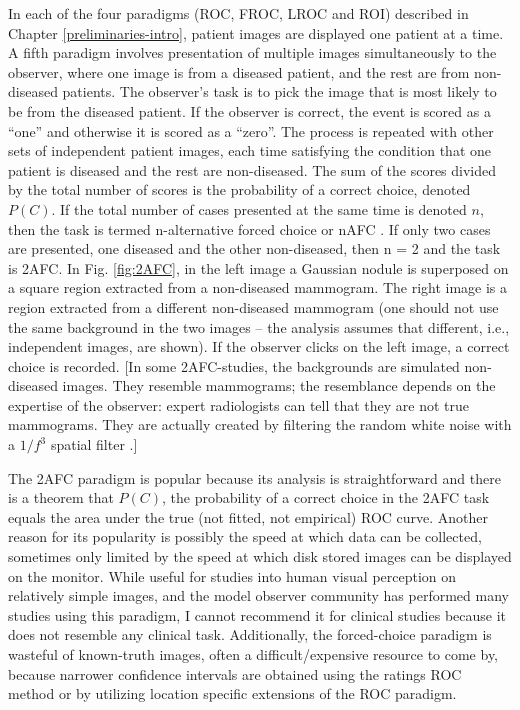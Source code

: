 \documentclass[
]{book}
\begin{document}
In each of the four paradigms (ROC, FROC, LROC and ROI) described in Chapter \ref{preliminaries-intro}, patient images are displayed one patient at a time. A fifth paradigm involves presentation of multiple images simultaneously to the observer, where one image is from a diseased patient, and the rest are from non-diseased patients. The observer's task is to pick the image that is most likely to be from the diseased patient. If the observer is correct, the event is scored as a ``one'' and otherwise it is scored as a ``zero''. The process is repeated with other sets of independent patient images, each time satisfying the condition that one patient is diseased and the rest are non-diseased. The sum of the scores divided by the total number of scores is the probability of a correct choice, denoted \(P(C)\). If the total number of cases presented at the same time is denoted \(n\), then the task is termed n-alternative forced choice or nAFC \citep{green1966signal}. If only two cases are presented, one diseased and the other non-diseased, then n = 2 and the task is 2AFC. In Fig. \ref{fig:2AFC}, in the left image a Gaussian nodule is superposed on a square region extracted from a non-diseased mammogram. The right image is a region extracted from a different non-diseased mammogram (one should not use the same background in the two images -- the analysis assumes that different, i.e., independent images, are shown). If the observer clicks on the left image, a correct choice is recorded. {[}In some 2AFC-studies, the backgrounds are simulated non-diseased images. They resemble mammograms; the resemblance depends on the expertise of the observer: expert radiologists can tell that they are not true mammograms. They are actually created by filtering the random white noise with a \(1/f^3\) spatial filter \citep{burgess2011visual}.{]}

The 2AFC paradigm is popular because its analysis is straightforward and there is a theorem \citep{green1966signal} that \(P(C)\), the probability of a correct choice in the 2AFC task equals the area under the true (not fitted, not empirical) ROC curve. Another reason for its popularity is possibly the speed at which data can be collected, sometimes only limited by the speed at which disk stored images can be displayed on the monitor. While useful for studies into human visual perception on relatively simple images, and the model observer community has performed many studies using this paradigm, I cannot recommend it for clinical studies because it does not resemble any clinical task. Additionally, the forced-choice paradigm is wasteful of known-truth images, often a difficult/expensive resource to come by, because narrower confidence intervals are obtained using the ratings ROC method or by utilizing location specific extensions of the ROC paradigm.
\end{document}
